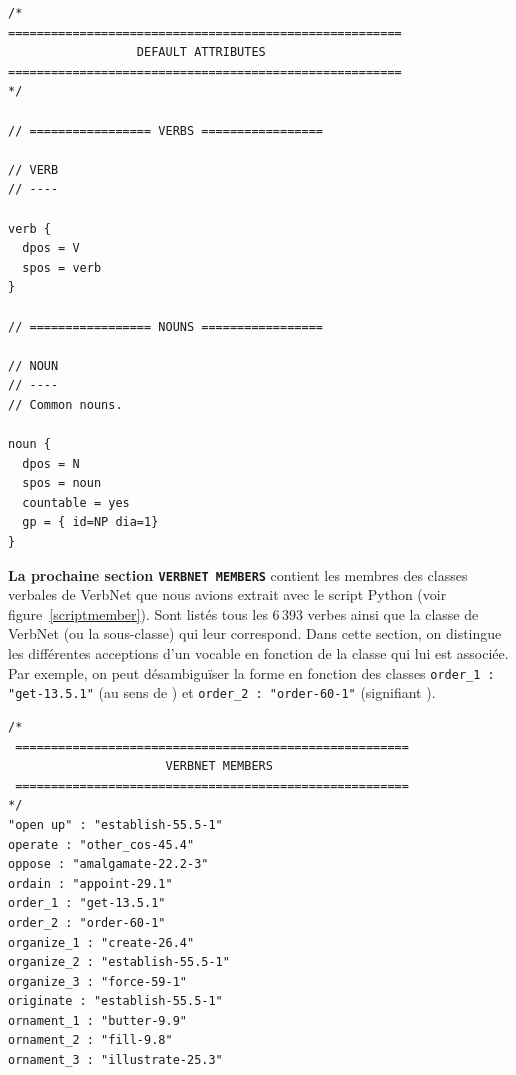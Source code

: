 \begin{minipage}{\linewidth}
\begin{lstlisting}[language=XML, caption = Attributs par défaut des classes génériques, label=classedef]
/*
=======================================================
                  DEFAULT ATTRIBUTES
=======================================================
*/

// ================= VERBS =================

// VERB
// ----

verb {
  dpos = V
  spos = verb
}

// ================= NOUNS =================

// NOUN
// ----
// Common nouns.

noun {
  dpos = N
  spos = noun
  countable = yes
  gp = { id=NP dia=1}
}
\end{lstlisting}
\end{minipage}

\textbf{La prochaine section \texttt{VERBNET MEMBERS}} contient les membres des classes verbales de VerbNet que nous avions extrait avec le script Python (voir figure~\ref{scriptmember}). Sont listés tous les 6\,393 verbes ainsi que la classe de VerbNet (ou la sous-classe) qui leur correspond. Dans cette section, on distingue les différentes acceptions d'un vocable en fonction de la classe qui lui est associée. Par exemple, on peut désambiguïser la forme  en fonction des classes \texttt{order\_1 : "get-13.5.1"} (au sens de ) et \texttt{order\_2 : "order-60-1"} (signifiant ).

\begin{minipage}{\linewidth}
\begin{lstlisting}[language=XML, caption = Partie membre du lexicon]
/*
 =======================================================
                      VERBNET MEMBERS
 =======================================================
*/
"open up" : "establish-55.5-1"
operate : "other_cos-45.4"
oppose : "amalgamate-22.2-3"
ordain : "appoint-29.1"
order_1 : "get-13.5.1"
order_2 : "order-60-1"
organize_1 : "create-26.4"
organize_2 : "establish-55.5-1"
organize_3 : "force-59-1"
originate : "establish-55.5-1"
ornament_1 : "butter-9.9"
ornament_2 : "fill-9.8"
ornament_3 : "illustrate-25.3"
\end{lstlisting}
\end{minipage}

